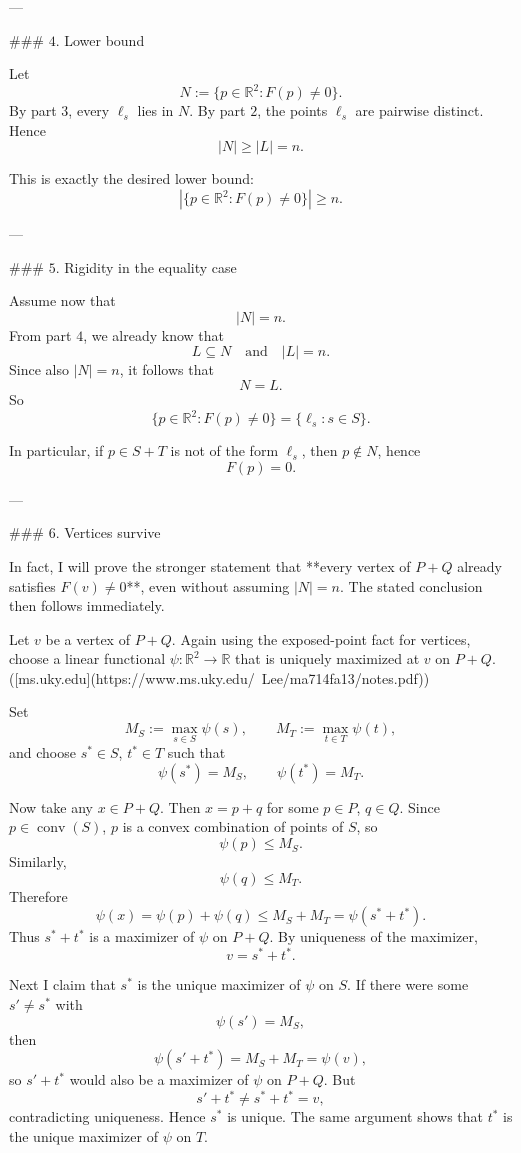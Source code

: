 ---

### \(4.\) Lower bound

Let
\[
N:=\{p\in\mathbb R^2:F(p)\neq 0\}.
\]
By part \(3\), every \(\ell_s\) lies in \(N\). By part \(2\), the points \(\ell_s\) are pairwise distinct. Hence
\[
|N|\ge |L|=n.
\]

This is exactly the desired lower bound:
\[
|\{p\in\mathbb R^2:F(p)\neq 0\}|\ge n.
\]

---

### \(5.\) Rigidity in the equality case

Assume now that
\[
|N|=n.
\]
From part \(4\), we already know that
\[
L\subseteq N
\quad\text{and}\quad
|L|=n.
\]
Since also \(|N|=n\), it follows that
\[
N=L.
\]
So
\[
\{p\in\mathbb R^2:F(p)\neq 0\}
=
\{\ell_s:s\in S\}.
\]

In particular, if \(p\in S+T\) is not of the form \(\ell_s\), then \(p\notin N\), hence
\[
F(p)=0.
\]

---

### \(6.\) Vertices survive

In fact, I will prove the stronger statement that **every vertex of \(P+Q\) already satisfies \(F(v)\neq 0\)**, even without assuming \(|N|=n\). The stated conclusion then follows immediately.

Let \(v\) be a vertex of \(P+Q\). Again using the exposed-point fact for vertices, choose a linear functional \(\psi:\mathbb R^2\to\mathbb R\) that is uniquely maximized at \(v\) on \(P+Q\). ([ms.uky.edu](https://www.ms.uky.edu/~Lee/ma714fa13/notes.pdf))

Set
\[
M_S:=\max_{s\in S}\psi(s),
\qquad
M_T:=\max_{t\in T}\psi(t),
\]
and choose \(s^\ast\in S\), \(t^\ast\in T\) such that
\[
\psi(s^\ast)=M_S,
\qquad
\psi(t^\ast)=M_T.
\]

Now take any \(x\in P+Q\). Then \(x=p+q\) for some \(p\in P\), \(q\in Q\). Since \(p\in\operatorname{conv}(S)\), \(p\) is a convex combination of points of \(S\), so
\[
\psi(p)\le M_S.
\]
Similarly,
\[
\psi(q)\le M_T.
\]
Therefore
\[
\psi(x)=\psi(p)+\psi(q)\le M_S+M_T
=\psi(s^\ast+t^\ast).
\]
Thus \(s^\ast+t^\ast\) is a maximizer of \(\psi\) on \(P+Q\). By uniqueness of the maximizer,
\[
v=s^\ast+t^\ast.
\]

Next I claim that \(s^\ast\) is the unique maximizer of \(\psi\) on \(S\). If there were some \(s'\neq s^\ast\) with
\[
\psi(s')=M_S,
\]
then
\[
\psi(s'+t^\ast)=M_S+M_T=\psi(v),
\]
so \(s'+t^\ast\) would also be a maximizer of \(\psi\) on \(P+Q\). But
\[
s'+t^\ast\neq s^\ast+t^\ast=v,
\]
contradicting uniqueness. Hence \(s^\ast\) is unique. The same argument shows that \(t^\ast\) is the unique maximizer of \(\psi\) on \(T\).

